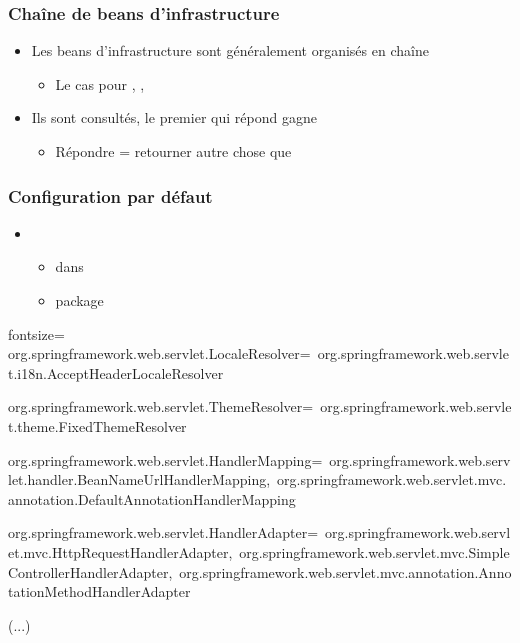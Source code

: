 \begin{frame}
 \frametitle{Chaîne de beans d'infrastructure}
 
 \begin{itemize}
  \item Les beans d'infrastructure sont généralement organisés en chaîne
  \begin{itemize}
   \item Le cas pour , , 
  \end{itemize}
  \item Ils sont consultés, le premier qui répond gagne
  \begin{itemize}
   \item Répondre = retourner autre chose que 
  \end{itemize}
  
 \end{itemize} 

\end{frame}

\begin{frame}[fragile]
 \frametitle{Configuration par défaut}
 
 \begin{itemize}
  \item {} 
  \begin{itemize}
   \item dans 
   \item package 
  \end{itemize}  
 \end{itemize} 

 \begin{textcode*}{fontsize=\tiny}
org.springframework.web.servlet.LocaleResolver=\
  org.springframework.web.servlet.i18n.AcceptHeaderLocaleResolver

org.springframework.web.servlet.ThemeResolver=\
  org.springframework.web.servlet.theme.FixedThemeResolver

org.springframework.web.servlet.HandlerMapping=\
  org.springframework.web.servlet.handler.BeanNameUrlHandlerMapping,\
  org.springframework.web.servlet.mvc.annotation.DefaultAnnotationHandlerMapping

org.springframework.web.servlet.HandlerAdapter=\
  org.springframework.web.servlet.mvc.HttpRequestHandlerAdapter,\
  org.springframework.web.servlet.mvc.SimpleControllerHandlerAdapter,\
  org.springframework.web.servlet.mvc.annotation.AnnotationMethodHandlerAdapter
  
(...)
 \end{textcode*}

\end{frame}

